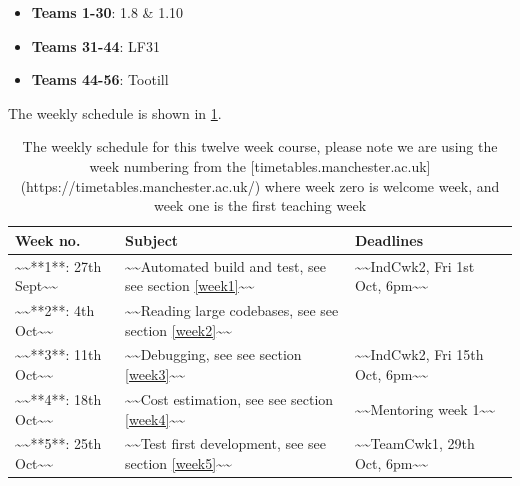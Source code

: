 \documentclass[
]{book}
\providecommand{\tightlist}{%
  \setlength{\itemsep}{0pt}\setlength{\parskip}{0pt}}
\begin{document}
\begin{itemize}
\tightlist
\item
  \textbf{Teams 1-30}: 1.8 \& 1.10
\item
  \textbf{Teams 31-44}: LF31
\item
  \textbf{Teams 44-56}: Tootill
\end{itemize}

The weekly schedule is shown in \ref{tab:schedtable}.

\begin{table}

\caption{\label{tab:schedtable}The weekly schedule for this twelve week course, please note we are using the week numbering from the [timetables.manchester.ac.uk](https://timetables.manchester.ac.uk/) where week zero is welcome week, and week one is the first teaching week}
\centering
\begin{tabular}[t]{lll}
\toprule
Week no. & Subject & Deadlines\\
\midrule
\textasciitilde{}\textasciitilde{}**1**: 27th Sept\textasciitilde{}\textasciitilde{} & \textasciitilde{}\textasciitilde{}Automated build and test, see see section \ref{week1}\textasciitilde{}\textasciitilde{} & \textasciitilde{}\textasciitilde{}IndCwk2, Fri 1st Oct, 6pm\textasciitilde{}\textasciitilde{}\\
\textasciitilde{}\textasciitilde{}**2**: 4th Oct\textasciitilde{}\textasciitilde{} & \textasciitilde{}\textasciitilde{}Reading large codebases, see see section \ref{week2}\textasciitilde{}\textasciitilde{} & \\
\textasciitilde{}\textasciitilde{}**3**: 11th Oct\textasciitilde{}\textasciitilde{} & \textasciitilde{}\textasciitilde{}Debugging, see see section \ref{week3}\textasciitilde{}\textasciitilde{} & \textasciitilde{}\textasciitilde{}IndCwk2, Fri 15th Oct, 6pm\textasciitilde{}\textasciitilde{}\\
\textasciitilde{}\textasciitilde{}**4**: 18th Oct\textasciitilde{}\textasciitilde{} & \textasciitilde{}\textasciitilde{}Cost estimation, see see section \ref{week4}\textasciitilde{}\textasciitilde{} & \textasciitilde{}\textasciitilde{}Mentoring week 1\textasciitilde{}\textasciitilde{}\\
\textasciitilde{}\textasciitilde{}**5**: 25th Oct\textasciitilde{}\textasciitilde{} & \textasciitilde{}\textasciitilde{}Test first development, see see section \ref{week5}\textasciitilde{}\textasciitilde{} & \textasciitilde{}\textasciitilde{}TeamCwk1, 29th Oct, 6pm\textasciitilde{}\textasciitilde{}\\

\end{tabular}
\end{table}
\end{document}
